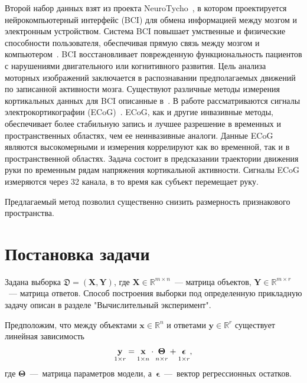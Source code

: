 \documentclass[12pt,twoside]{article}
\newcommand{\bx}{\mathbf{x}}
\newcommand{\by}{\mathbf{y}}
\newcommand{\bY}{\mathbf{Y}}
\newcommand{\bX}{\mathbf{X}}
\newcommand{\bTheta}{\boldsymbol{\Theta}}
\begin{document}
Второй набор данных взят из проекта NeuroTycho~\cite{neurotycho}, в котором проектируется нейрокомпьютерный интерфейс (BCI) для обмена информацией между мозгом и электронным устройством. 
Система BCI повышает умственные и физические способности пользователя, обеспечивая прямую связь между мозгом и компьютером~\cite{millan2004brain}. 
BCI восстановливает поврежденную функциональность пациентов с нарушениями двигательного или когнитивного развития. 
Цель анализа моторных изображений заключается в распознавании предполагаемых движений по записанной активности мозга. 
Существуют различные методы измерения кортикальных данных для BCI описанные в~\cite{nicolas2012brain,amiri2013review}. 
В работе рассматриваются сигналы электрокортикографии (ECoG)~\cite{eliseyev2016penalized}. ECoG, как и другие инвазивные методы, обеспечивает более стабильную запись и лучшее разрешение в временных и пространственных областях, чем ее неинвазивные аналоги.
Данные ECoG являются высокомерными и измерения коррелируют как во временной, так и в пространственной областях.
Задача состоит в предсказании траектории движения руки по временным рядам напряжения кортикальной активности. 
Сигналы ECoG измеряются через 32 канала, в то время как субъект перемещает руку. 

Предлагаемый метод позволил существенно снизить размерность признакового пространства. 
 

\section{Постановка задачи}
Задана выборка $\mathfrak{D}= \left( \bX, \bY \right)$, где $\mathbf{X} \in \mathbb{R}^{m \times n}$~--- матрица объектов, $\mathbf{Y} \in \mathbb{R}^{m \times r}$~--- матрица ответов. 
Способ построения выборки под определенную прикладную задачу описан в разделе "Вычислительный эксперимент".

Предположим, что между объектами $\bx \in \mathbb{R}^n$ и ответами $\by \in \mathbb{R}^r$ существует линейная зависимость 
\begin{equation}
 \underset{1 \times r}{\by} = \underset{1 \times n}{\vphantom{\by}\bx} \cdot \underset{n \times r}{\vphantom{\by}\bTheta} + \underset{1 \times r}{\vphantom{\by}\boldsymbol{\epsilon}}, 
\label{eq::model}
\end{equation}
где $\bTheta$~---~матрица параметров модели, а~$\boldsymbol{\epsilon}$~---~вектор регрессионных остатков.
\end{document}
